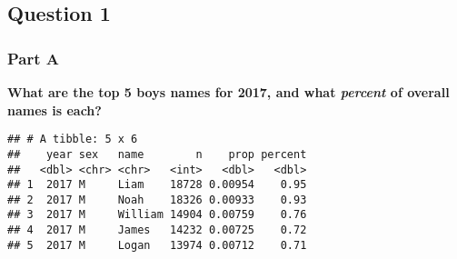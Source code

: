 \documentclass[
]{article}
\newenvironment{Shaded}{\begin{snugshade}}{\end{snugshade}}
\newcommand{\CommentTok}[1]{\textcolor[rgb]{0.56,0.35,0.01}{\textit{#1}}}
\newcommand{\DataTypeTok}[1]{\textcolor[rgb]{0.13,0.29,0.53}{#1}}
\newcommand{\DecValTok}[1]{\textcolor[rgb]{0.00,0.00,0.81}{#1}}
\newcommand{\KeywordTok}[1]{\textcolor[rgb]{0.13,0.29,0.53}{\textbf{#1}}}
\newcommand{\NormalTok}[1]{#1}
\newcommand{\OperatorTok}[1]{\textcolor[rgb]{0.81,0.36,0.00}{\textbf{#1}}}
\newcommand{\StringTok}[1]{\textcolor[rgb]{0.31,0.60,0.02}{#1}}
\begin{document}
\hypertarget{question-1}{%
\subsection{Question 1}\label{question-1}}

\hypertarget{part-a}{%
\subsubsection{Part A}\label{part-a}}

\textbf{What are the top 5 boys names for 2017, and what \emph{percent}
of overall names is each?}

\begin{Shaded}
\end{Shaded}

\begin{verbatim}
## # A tibble: 5 x 6
##    year sex   name        n    prop percent
##   <dbl> <chr> <chr>   <int>   <dbl>   <dbl>
## 1  2017 M     Liam    18728 0.00954    0.95
## 2  2017 M     Noah    18326 0.00933    0.93
## 3  2017 M     William 14904 0.00759    0.76
## 4  2017 M     James   14232 0.00725    0.72
## 5  2017 M     Logan   13974 0.00712    0.71
\end{verbatim}
\end{document}
